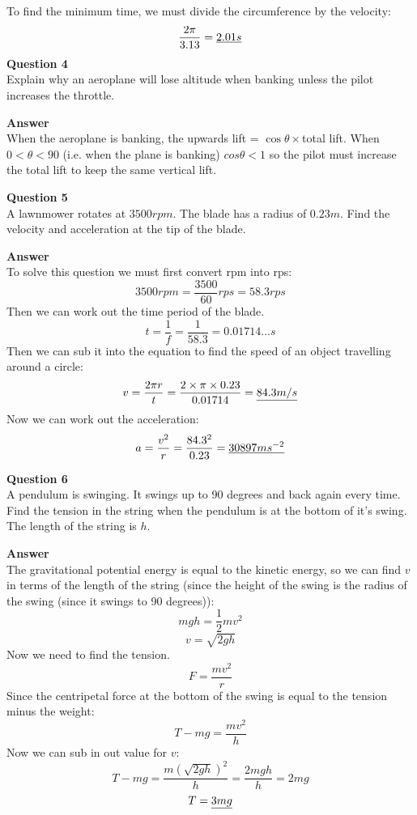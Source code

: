 \documentclass{article}
\begin{document}
To find the minimum time, we must divide the circumference by the velocity: 
	\[
		\frac{2\pi}{3.13} = \uline{2.01s}
	\]
\textbf{Question 4}\\
Explain why an aeroplane will lose altitude when banking unless the pilot
increases the throttle.

\textbf{Answer}\\
When the aeroplane is banking, the upwards lift = $\cos\theta \times$total lift.
When $0 < \theta < 90$ (i.e. when the plane is banking) $cos\theta<1$ so the
pilot must increase the total lift to keep the same vertical lift.

\textbf{Question 5}\\
A lawnmower rotates at $3500rpm$. The blade has a radius of $0.23m$. Find the
velocity and acceleration at the tip of the blade.

\textbf{Answer}\\
To solve this question we must first convert rpm into rps:
\[
	3500rpm = \frac{3500}{60}rps = 58.3rps
\]
Then we can work out the time period of the blade.
\[
	t = \frac{1}{f} = \frac{1}{58.3} = 0.01714...s
\]
Then we can sub it into the equation to find the speed of an object travelling
around a circle:
\[
	v = \frac{2 \pi r}{t} 
	  = \frac{2 \times \pi \times 0.23}{0.01714} 
	  = \uline{84.3m/s}
\]
Now we can work out the acceleration:
\[
	a = \frac{v^2}{r} = \frac{84.3^2}{0.23} = \uline{30897ms^{-2}}
\]

\textbf{Question 6}\\
A pendulum is swinging. It swings up to 90 degrees and back again every time. 
Find the tension in the string when the pendulum is at the bottom of it's swing.
The length of the string is $h$.

\textbf{Answer}\\
The gravitational potential energy is equal to the kinetic energy, so we can 
find $v$ in terms of the length of the string (since the height of the swing is
the radius of the swing (since it swings to 90 degrees)):
\[
	mgh = \frac{1}{2}mv^2
\]
\[
	v = \sqrt{2gh}
\]
Now we need to find the tension.
\[
	F = \frac{mv^2}{r}
\]
Since the centripetal force at the bottom of the swing is equal to the tension
minus the weight:
\[
	T - mg = \frac{mv^2}{h}
\]
Now we can sub in out value for $v$:
\[
	T - mg = \frac{m({\sqrt{2gh}})^2}{h} = \frac{2mgh}{h} = 2mg
\]
\[
	T = \uline{3mg}
\]
\end{document}
